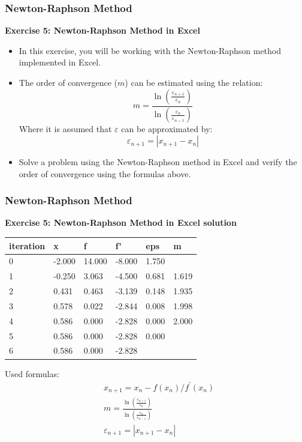 \begin{frame}[fragile]
    \frametitle{Newton-Raphson Method}
    
    \textbf{Exercise 5: Newton-Raphson Method in Excel}

    \begin{itemize}
        \item In this exercise, you will be working with the Newton-Raphson method implemented in Excel.
        \item The order of convergence (\(m\)) can be estimated using the relation:
        \[m = \frac{\ln\left(\frac{\varepsilon_{n+1}}{\varepsilon_{n}}\right)}{\ln\left(\frac{\varepsilon_{n}}{\varepsilon_{n-1}}\right)}\]
        Where it is assumed that $\varepsilon$ can be approximated by: 
        \[\varepsilon_{n+1} = |x_{n+1} - x_{n}|\]
        \item Solve a problem using the Newton-Raphson method in Excel and verify the order of convergence using the formulas above.
    \end{itemize}
\end{frame}

\begin{frame}[fragile]
  \frametitle{Newton-Raphson Method}
  
  \textbf{Exercise 5: Newton-Raphson Method in Excel solution}

  \begin{table}[]
    \begin{tabular}{|l|l|l|l|l|l|}
    \hline
    iteration & x      & f      & f'     & eps   & m     \\ \hline
    0         & -2.000 & 14.000 & -8.000 & 1.750 &       \\ \hline
    1         & -0.250 & 3.063  & -4.500 & 0.681 & 1.619 \\ \hline
    2         & 0.431  & 0.463  & -3.139 & 0.148 & 1.935 \\ \hline
    3         & 0.578  & 0.022  & -2.844 & 0.008 & 1.998 \\ \hline
    4         & 0.586  & 0.000  & -2.828 & 0.000 & 2.000 \\ \hline
    5         & 0.586  & 0.000  & -2.828 & 0.000 &       \\ \hline
    6         & 0.586  & 0.000  & -2.828 &       &       \\ \hline
    \end{tabular}
    \end{table}

    Used formulas:
    \begin{align*}
        &x_{n+1} = x_n - f(x_n)/f^\prime(x_n)  \\
        &m = \frac{\ln\left(\frac{\varepsilon_{n+1}}{\varepsilon_{n}}\right)}{\ln\left(\frac{\varepsilon_{n}}{\varepsilon_{n-1}}\right)}\\
        &\varepsilon_{n+1} = |x_{n+1} - x_{n}|
    \end{align*}
\end{frame}

